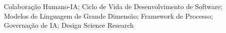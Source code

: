 \acresetall
\noindent Colaboração Humano-IA; Ciclo de Vida de Desenvolvimento de Software; Modelos de Linguagem de Grande Dimensão; Framework de Processo; Governação de IA; Design Science Research
